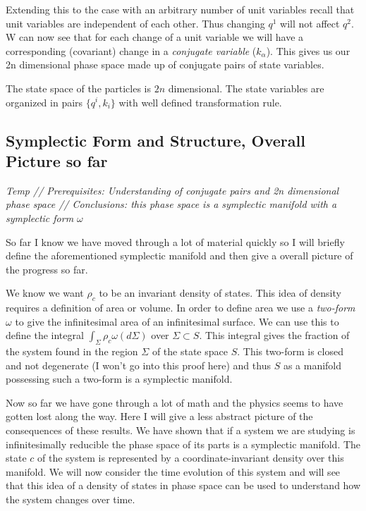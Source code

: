 \documentclass{article}
\begin{document}
	Extending this to the case with an arbitrary number of unit variables recall that unit variables are independent of each other. Thus changing $q^1$ will not affect $q^2$. W can now see that for each change of a unit variable we will have a corresponding (covariant) change in a \textit{conjugate variable} ($k_\alpha$). This gives us our 2n dimensional phase space made up of conjugate pairs of state variables. 

\begin{prop}
	The state space of the particles is $2n$ dimensional. The state variables are organized in pairs $\{q^i, k_i\}$ with well defined transformation rule.
\end{prop}

\subsection{Symplectic Form and Structure, Overall Picture so far}
\textsl{Temp // Prerequisites: Understanding of conjugate pairs and 2n dimensional phase space // Conclusions: this phase space is a symplectic manifold with a symplectic form $\omega$}

	So far I know we have moved through a lot of material quickly so I will briefly define the aforementioned symplectic manifold and then give a overall picture of the progress so far. 
	
	We know we want $\rho_c$ to be an invariant density of states. This idea of density requires a definition of area or volume. In order to define area we use a \textit{two-form} $\omega$ to give the infinitesimal area of an infinitesimal surface. We can use this to define the integral $\int_{\Sigma} \rho_c\omega(d\Sigma)$ over $\Sigma \subset S$.	This integral gives the fraction of the system found in the region $\Sigma$ of the state space $S$. This two-form is closed and not degenerate (I won't go into this proof here) and thus $S$ as a manifold possessing such a two-form is a symplectic manifold.
	
	Now so far we have gone through a lot of math and the physics seems to have gotten lost along the way. Here I will give a less abstract picture of the consequences of these results. We have shown that if a system we are studying is infinitesimally reducible the phase space of its parts is a symplectic manifold. The state $c$ of the system is represented by a coordinate-invariant density over this manifold. We will now consider the time evolution of this system and will see that this idea of a density of states in phase space can be used to understand how the system changes over time.
	
\end{document}
